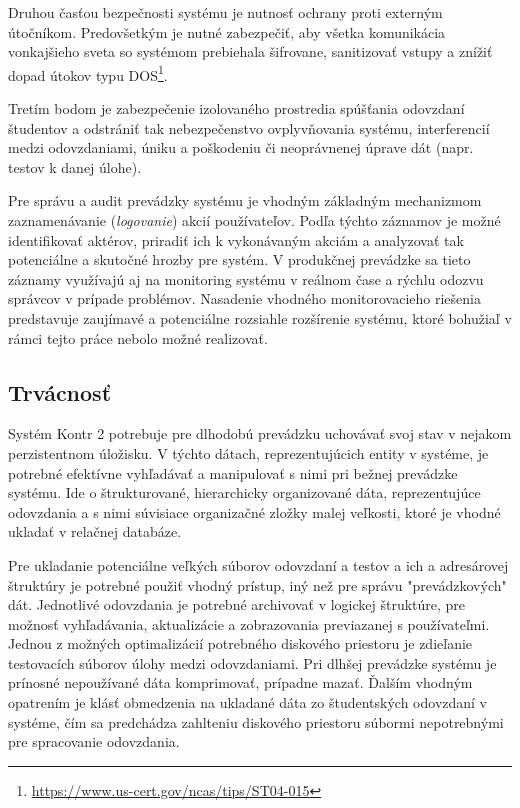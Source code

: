 \documentclass[
  digital, %
  twoside, %
  table,   %
  lof,     %
  lot,     %
]{fithesis3}
\begin{document}
Druhou časťou bezpečnosti systému je nutnosť ochrany proti externým útočníkom. Predovšetkým je nutné zabezpečiť, aby všetka komunikácia vonkajšieho sveta so systémom prebiehala šifrovane, sanitizovať vstupy a znížiť dopad útokov typu DOS\footnote{\url{https://www.us-cert.gov/ncas/tips/ST04-015}}. 

Tretím bodom je zabezpečenie izolovaného prostredia spúšťania odovzdaní študentov a odstrániť tak nebezpečenstvo ovplyvňovania systému, interferencií medzi odovzdaniami, úniku a poškodeniu či neoprávnenej úprave dát (napr. testov k danej úlohe).

Pre správu a audit prevádzky systému je vhodným základným mechanizmom zaznamenávanie (\emph{logovanie}) akcií používateľov. Podľa týchto záznamov je možné identifikovať aktérov, priradiť ich k vykonávaným akciám a analyzovať tak potenciálne a skutočné hrozby pre systém. V produkčnej prevádzke sa tieto záznamy využívajú aj na monitoring systému v reálnom čase a rýchlu odozvu správcov v prípade problémov. Nasadenie vhodného monitorovacieho riešenia predstavuje zaujímavé a potenciálne rozsiahle rozšírenie systému, ktoré bohužiaľ v rámci tejto práce nebolo možné realizovať.

\subsection{Trvácnosť}
Systém Kontr 2 potrebuje pre dlhodobú prevádzku uchovávať svoj stav v nejakom perzistentnom úložisku. V týchto dátach, reprezentujúcich entity v systéme, je potrebné efektívne vyhľadávať a manipulovať s nimi pri bežnej prevádzke systému. Ide o štrukturované, hierarchicky organizované dáta, reprezentujúce odovzdania a s nimi súvisiace organizačné zložky malej veľkosti, ktoré je vhodné ukladať v relačnej databáze\cite{fowler-pattern-application-arch}. 

Pre ukladanie potenciálne veľkých súborov odovzdaní a testov a ich a adresárovej štruktúry je potrebné použiť vhodný prístup, iný než pre správu "prevádzkových" dát. Jednotlivé odovzdania je potrebné archivovať v logickej štruktúre, pre možnosť vyhľadávania, aktualizácie a zobrazovania previazanej s používateľmi. Jednou z možných optimalizácií potrebného diskového priestoru je zdieľanie testovacích súborov úlohy medzi odovzdaniami. Pri dlhšej prevádzke systému je prínosné nepoužívané dáta komprimovať, prípadne mazať. Ďalším vhodným opatrením je klásť obmedzenia na ukladané dáta zo študentských odovzdaní v systéme, čím sa predchádza zahlteniu diskového priestoru súbormi nepotrebnými pre spracovanie odovzdania.
\end{document}
